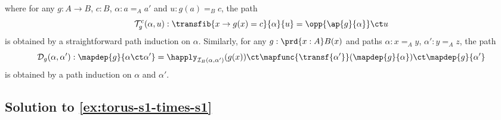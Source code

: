 \documentclass[
%
%
11pt %
]{article}
\newcommand{\transfun}[3]{\mathcal{I}_{#1}(#2, #3)}
\begin{document}
where for any $g : A \to B$, $c : B$, $\alpha : a =_A a'$ and $u : g(a) =_B c$, the path \[\mathcal{T}_g^c(\alpha,u) : \transfib{x \to g(x) = c}{\alpha}{u} = \opp{\ap{g}{\alpha}} \ct u\]
is obtained by a straightforward path induction on $\alpha$. Similarly, for any $g : \prd{x : A}B(x)$ and paths $\alpha: x =_A y$, $\alpha' : y =_A z$, the path
\[ \mathcal{D}_g(\alpha,\alpha') : \mapdep{g}{\alpha \ct \alpha'} = \happly_{\transfun{B}{\alpha}{\alpha'}}(g(x)) \ct \mapfunc{\transf{\alpha'}}(\mapdep{g}{\alpha}) \ct \mapdep{g}{\alpha'}\]
is obtained by a path induction on $\alpha$ and $\alpha'$.

\subsection*{Solution to \cref{ex:torus-s1-times-s1}}
\end{document}
